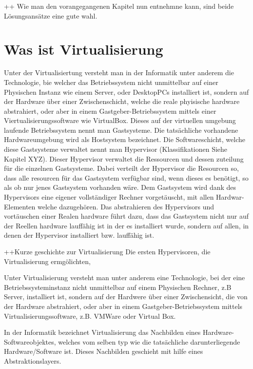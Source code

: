 \documentclass[14pt]{extreport}
\begin{document}
++
Wie man den vorangegangenen Kapitel nun entnehmne kann, sind beide Lösungsansätze eine gute wahl.


\chapter{Was ist Virtualisierung}
Unter der Virtualisiertung versteht man in der Informatik unter anderem die Technologie, bie welcher das Betriebssystem nicht unmittelbar auf einer Physischen Instanz wie einem Server, oder DesktopPCs installiert ist, sondern auf der Hardware über einer Zwischenschicht, welche die reale phyisische hardware abstrahiert, oder aber in einem Gastgeber-Betriebssystem mittels einer Viertualisierungssoftware wie VirtualBox.
Dieses auf der virtuellen umgebung laufende Betriebssystem nennt man Gastsysteme.
Die tatsächliche vorhandene Hardwareumgebung wird als Hostsystem bezeichnet. Die Softwareschicht, welche diese Gastsysteme verwaltet nennt man Hypervisor (Klassifikationen Siehe Kapitel XYZ).
Dieser Hypervisor verwaltet die Ressourcen und dessen zuteilung für die einzelnen Gastsysteme. Dabei verteilt der Hypervisor die Resourcen so, dass alle resourcen für das Gastsystem verfügbar sind, wenn dieses es benötigt, so als ob nur jenes Gastsystem vorhanden wäre.
Dem Gastsystem wird dank des Hypervisors eine eigener vollständiger Rechner vorgetäuscht, mit allen Hardwar-Elementen welche dazugehören. Das abstrahieren des Hypervisors und vortäuschen einer Realen hardware führt dazu, dass das Gastsystem nicht nur auf der Reellen hardware lauffähig ist in der es installiert wurde, sondern auf allen, in denen der Hypervisor installiert bzw. lauffähig ist.



++Kurze geschichte zur Virtualisierung
Die ersten Hypervisoren, die Virtualisierung ermgölichten, 



Unter Virtualisierung versteht man unter anderem eine Technologie, bei der eine Betriebssysteminstanz nicht unmittelbar auf einem Physischen Rechner, z.B Server, installiert ist, sondern auf der Hardwere über einer Zwischensicht, die von der Hardware abstrahiert, oder aber in einem Gastgeber-Betriebssystem mittels Virtualisierungssoftware, z.B. VMWare oder Virtual Box.

In der Informatik bezeichnet Virtualisierung das Nachbilden eines Hardware- Softwareobjektes, welches vom selben typ wie die tatsächliche darunterliegende Hardware/Software ist.
Dieses Nachbilden geschieht mit hilfe eines Abstraktionslayers.
\end{document}
